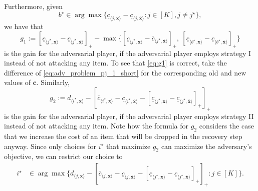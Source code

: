 Furthermore, given
\begin{equation} 
b^\star \in \arg\max \{ \underline{c}_{\langle j,\pmb{x}\rangle} - \underline{c}_{\langle j, \overline{\pmb{x}}\rangle} : j\in[K], j \neq j^\star\},
\label{eq:bstar}
\end{equation}
we have that
\begin{equation}
g_1 :=   [\underline{c}_{\langle j^\star,\pmb{x}\rangle} - \underline{c}_{\langle j^\star,\overline{\pmb{x}}\rangle}]_+ - \max\{[\underline{c}_{\langle j^\star,\pmb{x}\rangle} - \overline{c}_{\langle j^\star,\overline{\pmb{x}}\rangle}]_+,\ [\underline{c}_{\langle b^\star,\pmb{x}\rangle} - \underline{c}_{\langle b^\star,\overline{\pmb{x}}\rangle}]_+ \} 
\label{eq:g1}
\end{equation}
is the gain for the adversarial player, if the adversarial player employs strategy I instead of not attacking any item. 
To see that \cref{eq:g1} is correct, take the difference of \cref{eq:adv_problem_pj_1_short} for the corresponding old and new values of $\pmb{c}$.
Similarly,
\begin{equation}
 g_2 := d_{\langle i^\star,\pmb{x}\rangle} - [\overline{c}_{\langle i^\star,\pmb{x}\rangle}-\underline{c}_{\langle i^\star,\overline{\pmb{x}}\rangle} - [\underline{c}_{\langle j^\star,\pmb{x}\rangle} - \underline{c}_{\langle j^\star,\overline{\pmb{x}}\rangle}]_+]_+
\label{eq:g2} 
\end{equation}
is the gain for the adversarial player, if the adversarial player employs strategy II instead of not attacking any item.
Note how the formula for $g_2$ considers the case that we increase the cost of an 
item that will be dropped in the recovery step anyway.
Since only choices for $i^\star$ that maximize $g_2$ can maximize the adversary's 
objective, we can restrict our choice to
\begin{align}
  i^\star &\in \arg\max \{ d_{\langle j,\pmb{x}\rangle} - [\overline{c}_{\langle j, \pmb{x} \rangle}-\underline{c}_{\langle j,\overline{\pmb{x}}\rangle} - [\underline{c}_{\langle j^\star,\pmb{x}\rangle} - \underline{c}_{\langle j^\star, \overline{\pmb{x}}\rangle}]_+]_+  : j\in[K] \}.
  \label{eq:istar}
\end{align}


